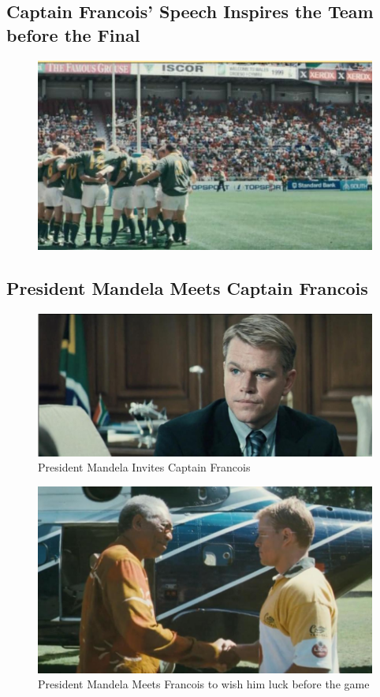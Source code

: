 \documentclass[11pt]{article}
\begin{document}
\subsection{Captain Francois' Speech Inspires the Team before the Final}

\begin{figure}[H]
	\centering
	\includegraphics[scale=0.8]{2.jpg}
\end{figure}

\subsection{President Mandela Meets Captain Francois}


\begin{figure}[H]
	\centering
	\includegraphics[scale=0.4]{3.jpg}
	\caption{President Mandela Invites Captain Francois}
\end{figure}

\begin{figure}[H]
	\centering
	\includegraphics[scale=0.5]{3.1.jpg}
	\caption{President Mandela Meets Francois to wish him luck before the game}
\end{figure}
\end{document}
